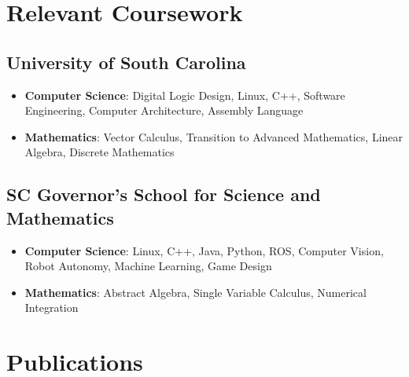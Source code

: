 \documentclass[10pt,letterpaper,roman]{moderncv}
\begin{document}
\section{Relevant Coursework}
\subsection{\textbf{University of South Carolina}}
\begin{itemize}
  \item \textbf{Computer Science}: Digital Logic Design, Linux, C++, Software Engineering, Computer Architecture, Assembly Language
  \item \textbf{Mathematics}: Vector Calculus, Transition to Advanced Mathematics, Linear Algebra, Discrete Mathematics
\end{itemize}
\subsection{\textbf{SC Governor's School for Science and Mathematics}}
\begin{itemize}
  \item \textbf{Computer Science}: Linux, C++, Java, Python, ROS, Computer Vision, Robot Autonomy, Machine Learning, Game Design
  \item \textbf{Mathematics}: Abstract Algebra, Single Variable Calculus, Numerical Integration
\end{itemize}

\section{Publications}
  \nocite{*}
  \printbibliography[heading=none]{}
\end{document}
